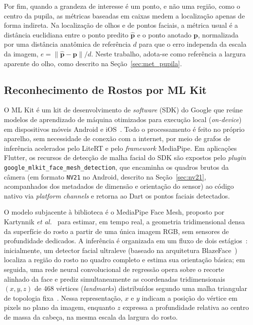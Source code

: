 Por fim, quando a grandeza de interesse é um ponto, e não uma região, como o centro da pupila, as métricas baseadas em caixas medem a localização apenas de forma indireta. Na localização de olhos e de pontos faciais, a métrica usual é a distância euclidiana entre o ponto predito $\hat{\mathbf{p}}$ e o ponto anotado $\mathbf{p}$, normalizada por uma distância anatômica de referência $d$ para que o erro independa da escala da imagem, $e = \lVert \hat{\mathbf{p}} - \mathbf{p} \rVert / d$. Neste trabalho, adota-se como referência a largura aparente do olho, como descrito na Seção~\ref{sec:met_pupila}.

\subsection{Reconhecimento de Rostos por ML Kit} \label{sec:mlkit}

O ML Kit é um kit de desenvolvimento de \textit{software} (SDK) do Google que reúne modelos de aprendizado de máquina otimizados para execução local (\textit{on-device}) em dispositivos móveis Android e iOS~\cite{mlkit_facemesh}. Todo o processamento é feito no próprio aparelho, sem necessidade de conexão com a internet, por meio de grafos de inferência acelerados pelo LiteRT e pelo \textit{framework} MediaPipe. Em aplicações Flutter, os recursos de detecção de malha facial do SDK são expostos pelo \textit{plugin} \texttt{google\_mlkit\_face\_mesh\_detection}, que encaminha os quadros brutos da câmera (em formato \texttt{NV21} no Android, descrito na Seção~\ref{sec:nv21}, acompanhados dos metadados de dimensão e orientação do sensor) ao código nativo via \textit{platform channels} e retorna ao Dart os pontos faciais detectados.

O modelo subjacente à biblioteca é o MediaPipe Face Mesh, proposto por Kartynnik \textit{et al.}~\cite{kartynnik2019real} para estimar, em tempo real, a geometria tridimensional densa da superfície do rosto a partir de uma única imagem RGB, sem sensores de profundidade dedicados. A inferência é organizada em um fluxo de dois estágios~\cite{kartynnik2019real,mlkit_facemesh}: inicialmente, um detector facial ultraleve (baseado na arquitetura BlazeFace~\cite{bazarevsky2019blazeface}) localiza a região do rosto no quadro completo e estima sua orientação básica; em seguida, uma rede neural convolucional de regressão opera sobre o recorte alinhado da face e prediz simultaneamente as coordenadas tridimensionais $(x, y, z)$ de 468 vértices (\textit{landmarks}) distribuídos segundo uma malha triangular de topologia fixa~\cite{kartynnik2019real,mlkit_facemesh}. Nessa representação, $x$ e $y$ indicam a posição do vértice em pixels no plano da imagem, enquanto $z$ expressa a profundidade relativa ao centro de massa da cabeça, na mesma escala da largura do rosto.

